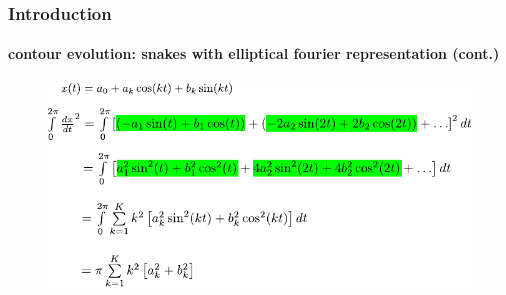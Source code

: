 \begin{frame}
\frametitle{Introduction}
\framesubtitle{contour evolution: snakes with elliptical fourier representation (cont.)}
\mypagenum
	\begin{figure}
		\includegraphics[width=1.0\textwidth]{figs/theory_curves_ellipticalFourierSnakes_extra.pdf}
	\end{figure}
\end{frame}



